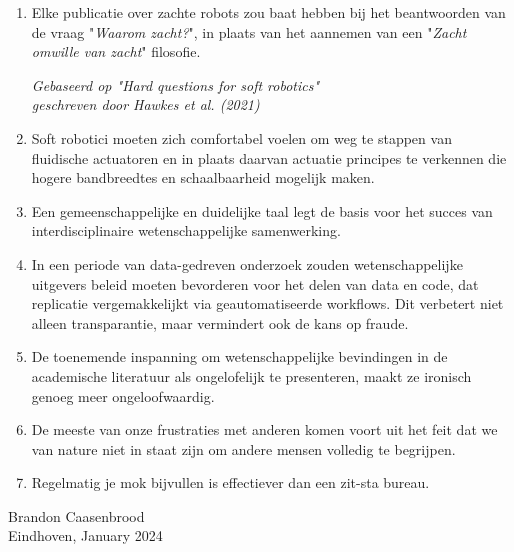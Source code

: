 \documentclass[a5paper]{article}
\begin{document}
\begin{enumerate}
\item Elke publicatie over zachte robots zou baat hebben bij het beantwoorden van de vraag "\textit{Waarom zacht?}", in plaats van het aannemen van een "\textit{Zacht omwille van zacht}" filosofie.
%  
\begin{flushright}
\vspace{-3mm}
\textit{Gebaseerd op "Hard questions for soft robotics" \\ geschreven door Hawkes et al. (2021)}
\vspace{-1mm}
\end{flushright}  

\item Soft robotici moeten zich comfortabel voelen om weg te stappen van fluidische actuatoren en in plaats daarvan actuatie principes te verkennen die hogere bandbreedtes en schaalbaarheid mogelijk maken.

\item Een gemeenschappelijke en duidelijke taal legt de basis voor het succes van interdisciplinaire wetenschappelijke samenwerking.

\item In een periode van data-gedreven onderzoek zouden wetenschappelijke uitgevers beleid moeten bevorderen voor het delen van data en code, dat replicatie vergemakkelijkt via geautomatiseerde workflows. Dit verbetert niet alleen transparantie, maar vermindert ook de kans op fraude.

\item De toenemende inspanning om wetenschappelijke bevindingen in de academische literatuur als ongelofelijk te presenteren, maakt ze ironisch genoeg meer ongeloofwaardig.

\item De meeste van onze frustraties met anderen komen voort uit het feit dat we van nature niet in staat zijn om andere mensen volledig te begrijpen.

\item Regelmatig je mok bijvullen is effectiever dan een zit-sta bureau.


\end{enumerate}

\vfill
\begin{flushright}
Brandon Caasenbrood \\[0.15em]
Eindhoven, January 2024
\end{flushright} 


\end{document}
